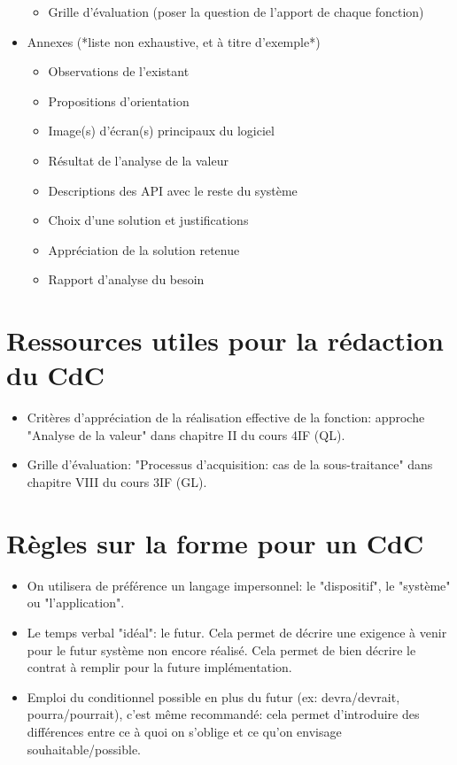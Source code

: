 \documentclass[a4paper]{article}
\begin{document}
\begin{itemize}
  \begin{itemize}
  \item Grille d'évaluation (poser la question de l'apport de chaque fonction)
  \end{itemize}
\item Annexes (*liste non exhaustive, et à titre d'exemple*)
  \begin{itemize}
  \item Observations de l'existant
  \item Propositions d'orientation
  \item Image(s) d'écran(s) principaux du logiciel
  \item Résultat de l'analyse de la valeur
  \item Descriptions des API avec le reste du système
  \item Choix d'une solution et justifications
  \item Appréciation de la solution retenue
  \item Rapport d'analyse du besoin
  \end{itemize}
\end{itemize}

\section{Ressources utiles pour la rédaction du CdC}

\begin{itemize}
\item Critères d'appréciation de la réalisation effective de la fonction: approche "Analyse de la valeur" dans chapitre II du cours 4IF (QL).
\item Grille d'évaluation: "Processus d'acquisition: cas de la sous-traitance" dans chapitre VIII du cours 3IF (GL).
\end{itemize}


\section{Règles sur la forme pour un CdC}

\begin{itemize}
\item On utilisera de préférence un langage impersonnel: le "dispositif", le "système" ou "l'application".
\item Le temps verbal "idéal": le futur. Cela permet de décrire une exigence à venir pour le futur système non encore réalisé. Cela permet de bien décrire le contrat à remplir pour la future implémentation.
\item Emploi du conditionnel possible en plus du futur (ex: devra/devrait, pourra/pourrait), c'est même recommandé: cela permet d'introduire des différences entre ce à quoi on s'oblige et ce qu'on envisage souhaitable/possible.
\end{itemize}
\end{document}
